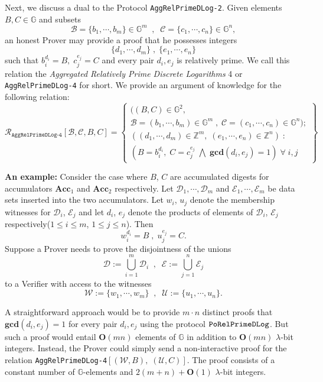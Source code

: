 \documentclass[11pt, lettersize, notitlepage, leqno, footskip=0.6cm]{article}
\newcommand{\bz}{\mathbb Z}
\newcommand{\ttt}{\texttt}
\newcommand{\Acc}{\mbf{Acc}}
\newcommand{\mc}{\mathcal}
\newcommand{\mb}{\mathbb}
\newcommand{\mbf}{\mathbf}
\newcommand{\lamb}{\lambda}
\newcommand{\bO}{\mbf{O}}
\newcommand{\vs}{\vspace{-0.15cm}}
\newcommand{\GCD}{\mbf{gcd}}
\numberwithin{equation}{section}
\begin{document}
Next, we discuss a dual to the Protocol \verb|AggRelPrimeDLog-2|. Given elements $B, C\in \mb{G}$ and subsets \vspace{-0.15cm}$$\mc{B} = \{b_1,\cdots, b_m\}\in \mb{G}^m \;\;,\;\; \mc{C} = \{c_1,\cdots, c_n\}\in \mb{G}^n,$$ an honest Prover may provide a proof that he possesses integers \vs $$\{d_1,\cdots, d_m\}\;,\; \{e_1,\cdots, e_n\}$$ such that $b_i^{d_i} = B,\; c_j^{e_j} = C$ and every pair $d_i, e_j$ is relatively prime. We call this relation the \textit{Aggregated Relatively Prime Discrete Logarithms} 4 or \verb|AggRelPrimeDLog-4| for short. We provide an argument of knowledge for the following relation:
\[
  \mc{R}_{\ttt{AggRelPrimeDLog-4}}[\mc{B}, \mc{C}, B, C] = \left\{\begin{array}{l}
    ((B,C)\in\mb{G}^2,\;\\
     \mc{B} = (b_1,\cdots,b_m)\in\mb{G}^m\;,\;\mc{C} = (c_1,\cdots, c_n)\in\mb{G}^n);\\
    ((d_1,\cdots,d_m)\in\bz^m,\; (e_1,\cdots,e_n)\in\bz^n)\;: \\
    (B = b_i^{d_i},\; C = c_j^{e_j}\;\bigwedge \; \GCD(d_i, e_j) = 1)\;\forall \;i,j
  \end{array}\right\}
\] 

\noindent \textbf{An example:} Consider the case where $B$, $C$ are accumulated digests for accumulators $\Acc_1$ and $\Acc_2$ respectively. Let $\mc{D}_1,\cdots,\mc{D}_m$ and $\mc{E}_1,\cdots,\mc{E}_m$ be data sets inserted into the two accumulators. Let $w_i$, $u_j$ denote the membership witnesses for $\mc{D}_i$, $\mc{E}_j$ and let $d_i$, $e_j$ denote the products of elements of $\mc{D}_i$, $\mc{E}_j$ respectively($1\leq i\leq m$, $1\leq j\leq n$). Then $$w_i^{d_i} = B\;,\; u_j^{e_j} = C.$$ Suppose a Prover needs to prove the disjointness of the unions \vs $$\mc{D} := \bigcup\limits_{i=1}^m \mc{D}_i\;\;,\;\;\mc{E} := \bigcup\limits_{j=1}^n \mc{E}_j$$ to a Verifier with access to the witnesses \vs $$\mc{W}:= \{w_1,\cdots,w_m \}\;\;,\;\;\mc{U}:= \{u_1,\cdots,u_n \}.$$

A straightforward approach would be to provide $m\cdot n$ distinct proofs that $\GCD(d_i, e_j) = 1$ for every pair $d_i,e_j$ using the protocol $\tt{PoRelPrimeDLog}$. But such a proof would entail $\mbf{O}(mn)$ elements of $\mb{G}$ in addition to $\mbf{O}(mn)$ $\lamb$-bit integers. Instead, the Prover could simply send a non-interactive proof for the relation \verb|AggRelPrimeDLog-4|$[(\mc{W}, B),\;(\mc{U}, C)]$. The proof consists of a constant number of $\mb{G}$-elements and $2(m+n)+\bO(1)$ $\lamb$-bit integers.\vspace{0.1cm} 
\end{document}
